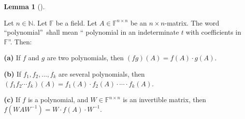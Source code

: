 \documentclass[numbers=enddot,12pt,final,onecolumn,notitlepage]{scrartcl}%
\numberwithin{exer}{subsection}
\theoremstyle{definition}
\newtheorem{lem}[theo]{Lemma}
\newenvironment{lemma}[1][]
{\begin{lem}[#1]\begin{leftbar}}
{\end{leftbar}\end{lem}}
\begin{document}
\begin{lemma}
\label{lem.p(A).multiplicative}Let $n\in\mathbb{N}$. Let $\mathbb{F}$ be a
field. Let $A\in\mathbb{F}^{n\times n}$ be an $n\times n$-matrix. The word
\textquotedblleft polynomial\textquotedblright\ shall mean \textquotedblleft
polynomial in an indeterminate $t$ with coefficients in $\mathbb{F}%
$\textquotedblright. Then: \medskip

\textbf{(a)} If $f$ and $g$ are two polynomials, then $\left(  fg\right)
\left(  A\right)  =f\left(  A\right)  \cdot g\left(  A\right)  $. \medskip

\textbf{(b)} If $f_{1},f_{2},\ldots,f_{k}$ are several polynomials, then
$\left(  f_{1}f_{2}\cdots f_{k}\right)  \left(  A\right)  =f_{1}\left(
A\right)  \cdot f_{2}\left(  A\right)  \cdot\cdots\cdot f_{k}\left(  A\right)
$. \medskip

\textbf{(c)} If $f$ is a polynomial, and $W\in\mathbb{F}^{n\times n}$ is an
invertible matrix, then $f\left(  WAW^{-1}\right)  =W\cdot f\left(  A\right)
\cdot W^{-1}$.
\end{lemma}
\end{document}
